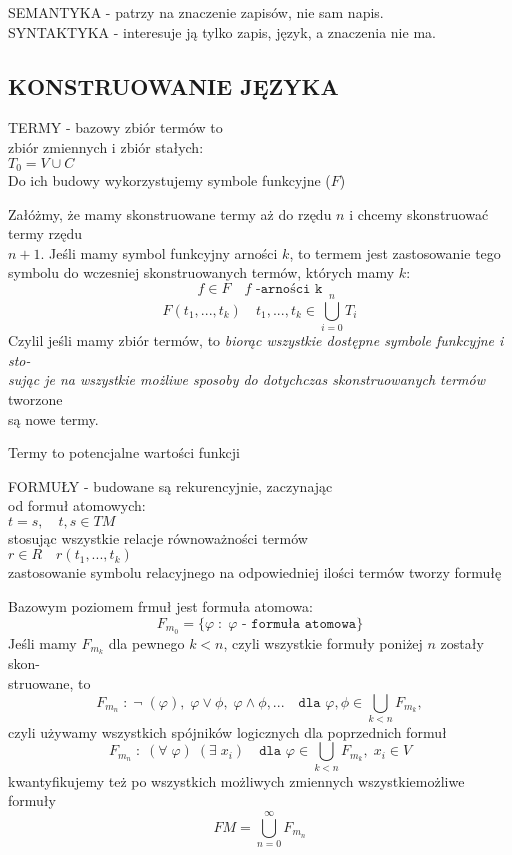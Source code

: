 \documentclass{article}
\begin{document}
{\color{def}SEMANTYKA} - patrzy na znaczenie zapisów, nie sam napis.\\
{\color{def}SYNTAKTYKA} - interesuje ją tylko zapis, język, a znaczenia nie ma.

\subsection{KONSTRUOWANIE JĘZYKA}
\begin{center}\large
    {\color{def}TERMY} - bazowy zbiór termów to \\zbiór zmiennych i zbiór stałych:\smallskip\\
    $T_0=V\cup C$\smallskip\\
    {\normalsize Do ich budowy wykorzystujemy symbole funkcyjne ($F$)}
\end{center}
Załóżmy, że mamy skonstruowane termy aż do rzędu $n$ i chcemy skonstruować termy rzędu \\$n+1$. Jeśli mamy symbol funkcyjny arności $k$, to {\color{emp}termem jest zastosowanie tego symbolu do wczesniej skonstruowanych termów}, których mamy $k$:
$$f\in F\quad f\texttt{ -arności k}$$
$$F(t_1, ..., t_k)\quad t_1, ..., t_k\in \bigcup\limits_{i=0}^n T_i$$
Czylil jeśli mamy zbiór termów, to \emph{\color{emp}biorąc wszystkie dostępne symbole funkcyjne i sto-\\sując je na wszystkie możliwe sposoby do dotychczas skonstruowanych termów} tworzone \\są nowe termy.\medskip
\begin{center}Termy to potencjalne wartości funkcji\end{center}\bigskip
\begin{center}\large
    {\color{def}FORMUŁY} - budowane są rekurencyjnie, zaczynając \\od formuł atomowych:\smallskip\\
    $t=s,\quad t,s\in TM$\smallskip\\
    stosując wszystkie relacje równoważności termów\smallskip\\
    $r\in R\quad r(t_1, ..., t_k)$\smallskip\\
    {\normalsize zastosowanie symbolu relacyjnego na odpowiedniej ilości termów tworzy formułę}
\end{center}\medskip
Bazowym poziomem frmuł jest formuła atomowa:
$$F_{m_0}=\{\varphi\;:\;\varphi\texttt{ - formuła atomowa}\}$$
Jeśli mamy $F_{m_k}$ dla pewnego $k<n$, czyli wszystkie formuły poniżej $n$ zostały skon-\\struowane, to
$$F_{m_n}\;:\;\neg\;(\varphi),\;\varphi\lor\phi,\;\varphi\land\phi,...\quad \texttt{dla }\varphi,\phi\in\bigcup\limits_{k<n}F_{m_k},$$
czyli {\color{emp}używamy wszystkich spójników logicznych} dla poprzednich formuł
$$F_{m_n}\;:\;(\forall\;\varphi)\;(\exists\;x_i)\quad \texttt{dla }\varphi\in\bigcup\limits_{k<n}F_{m_k},\;x_i\in V$$
{\color{emp}kwantyfikujemy też po wszystkich możliwych zmiennych wszystkiemożliwe formuły}
$$FM = \bigcup\limits_{n=0}^\infty F_{m_n}$$
\end{document}
